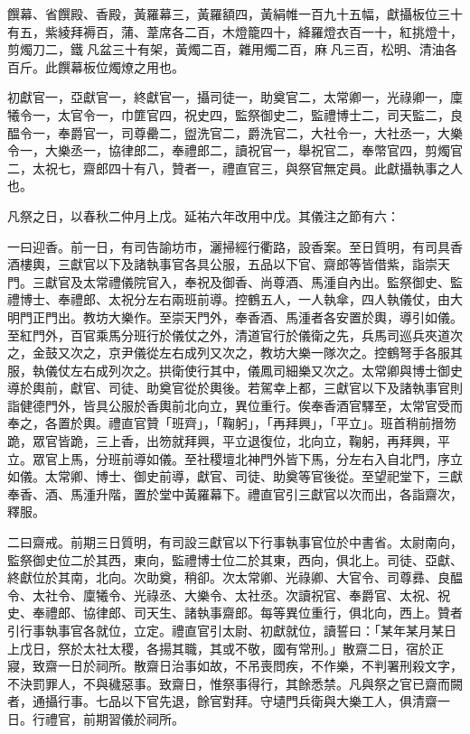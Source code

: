\begin{pinyinscope}
 饌幕、省饌殿、香殿，黃羅幕三，黃羅額四，黃絹帷一百九十五幅，獻攝板位三十有五，紫綾拜褥百，蒲、葦席各二百，木燈籠四十，絳羅燈衣百一十，紅挑燈十，剪燭刀二，鐵凡盆三十有架，黃燭二百，雜用燭二百，麻凡三百，松明、清油各百斤。此饌幕板位燭燎之用也。



 初獻官一，亞獻官一，終獻官一，攝司徒一，助奠官二，太常卿一，光祿卿一，廩犧令一，太官令一，巾篚官四，祝史四，監祭御史二，監禮博士二，司天監二，良醖令一，奉爵官一，司尊罍二，盥洗官二，爵洗官二，大社令一，大社丞一，大樂令一，大樂丞一，協律郎二，奉禮郎二，讀祝官一，舉祝官二，奉幣官四，剪燭官二，太祝七，齋郎四十有八，贊者一，禮直官三，與祭官無定員。此獻攝執事之人也。



 凡祭之日，以春秋二仲月上戊。延祐六年改用中戊。其儀注之節有六：



 一曰迎香。前一日，有司告諭坊市，灑掃經行衢路，設香案。至日質明，有司具香酒樓輿，三獻官以下及諸執事官各具公服，五品以下官、齋郎等皆借紫，詣崇天門。三獻官及太常禮儀院官入，奉祝及御香、尚尊酒、馬湩自內出。監祭御史、監禮博士、奉禮郎、太祝分左右兩班前導。控鶴五人，一人執傘，四人執儀仗，由大明門正門出。教坊大樂作。至崇天門外，奉香酒、馬湩者各安置於輿，導引如儀。至紅門外，百官乘馬分班行於儀仗之外，清道官行於儀衛之先，兵馬司巡兵夾道次之，金鼓又次之，京尹儀從左右成列又次之，教坊大樂一隊次之。控鶴弩手各服其服，執儀仗左右成列次之。拱衛使行其中，儀鳳司細樂又次之。太常卿與博士御史導於輿前，獻官、司徒、助奠官從於輿後。若駕幸上都，三獻官以下及諸執事官則詣健德門外，皆具公服於香輿前北向立，異位重行。俟奉香酒官驛至，太常官受而奉之，各置於輿。禮直官贊「班齊」，「鞠躬」，「再拜興」，「平立」。班首稍前搢笏跪，眾官皆跪，三上香，出笏就拜興，平立退復位，北向立，鞠躬，再拜興，平立。眾官上馬，分班前導如儀。至社稷壇北神門外皆下馬，分左右入自北門，序立如儀。太常卿、博士、御史前導，獻官、司徒、助奠等官後從。至望祀堂下，三獻奉香、酒、馬湩升階，置於堂中黃羅幕下。禮直官引三獻官以次而出，各詣齋次，釋服。



 二曰齋戒。前期三日質明，有司設三獻官以下行事執事官位於中書省。太尉南向，監祭御史位二於其西，東向，監禮博士位二於其東，西向，俱北上。司徒、亞獻、終獻位於其南，北向。次助奠，稍卻。次太常卿、光祿卿、大官令、司尊彞、良醖令、太社令、廩犧令、光祿丞、大樂令、太社丞。次讀祝官、奉爵官、太祝、祝史、奉禮郎、協律郎、司天生、諸執事齋郎。每等異位重行，俱北向，西上。贊者引行事執事官各就位，立定。禮直官引太尉、初獻就位，讀誓曰：「某年某月某日上戊日，祭於太社太稷，各揚其職，其或不敬，國有常刑。」散齋二日，宿於正寢，致齋一日於祠所。散齋日治事如故，不吊喪問疾，不作樂，不判署刑殺文字，不決罰罪人，不與穢惡事。致齋日，惟祭事得行，其餘悉禁。凡與祭之官已齋而闕者，通攝行事。七品以下官先退，餘官對拜。守壝門兵衛與大樂工人，俱清齋一日。行禮官，前期習儀於祠所。




\end{pinyinscope}
